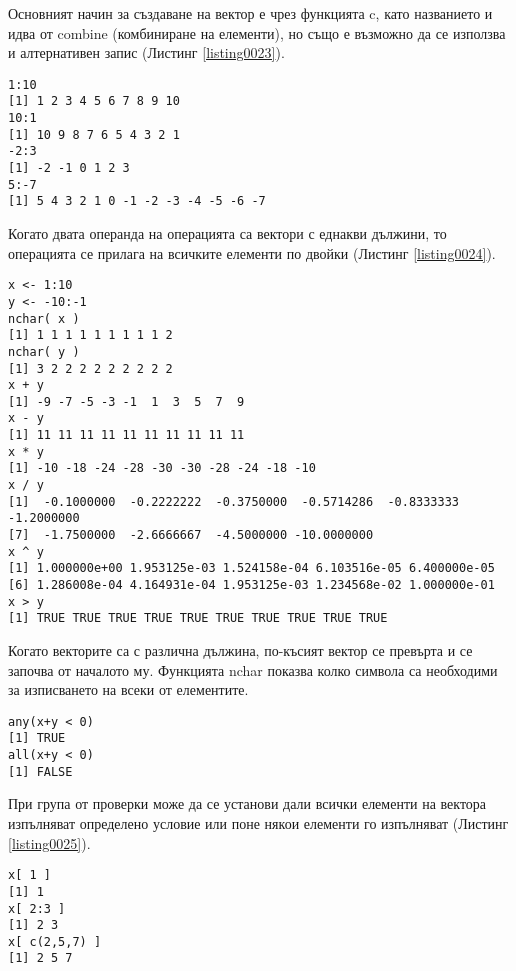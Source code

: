 Основният начин за създаване на вектор е чрез функцията c, като названието и идва от combine (комбиниране на елементи), но също е възможно да се използва и алтернативен запис (Листинг \ref{listing0023}). 

\begin{lstlisting}[caption=Алтернативен синтаксис за създаване на вектори, label=listing0023]
1:10
[1] 1 2 3 4 5 6 7 8 9 10
10:1
[1] 10 9 8 7 6 5 4 3 2 1
-2:3
[1] -2 -1 0 1 2 3
5:-7
[1] 5 4 3 2 1 0 -1 -2 -3 -4 -5 -6 -7
\end{lstlisting}

Когато двата операнда на операцията са вектори с еднакви дължини, то операцията се прилага на всичките елементи по двойки (Листинг \ref{listing0024}).

\begin{lstlisting}[caption=Операции между вектори с еднаква дължина, label=listing0024]
x <- 1:10
y <- -10:-1
nchar( x )
[1] 1 1 1 1 1 1 1 1 1 2
nchar( y )
[1] 3 2 2 2 2 2 2 2 2 2
x + y
[1] -9 -7 -5 -3 -1  1  3  5  7  9
x - y
[1] 11 11 11 11 11 11 11 11 11 11
x * y
[1] -10 -18 -24 -28 -30 -30 -28 -24 -18 -10
x / y
[1]  -0.1000000  -0.2222222  -0.3750000  -0.5714286  -0.8333333  -1.2000000
[7]  -1.7500000  -2.6666667  -4.5000000 -10.0000000
x ^ y
[1] 1.000000e+00 1.953125e-03 1.524158e-04 6.103516e-05 6.400000e-05
[6] 1.286008e-04 4.164931e-04 1.953125e-03 1.234568e-02 1.000000e-01
x > y
[1] TRUE TRUE TRUE TRUE TRUE TRUE TRUE TRUE TRUE TRUE
\end{lstlisting}

Когато векторите са с различна дължина, по-късият вектор се превърта и се започва от началото му. Функцията nchar показва колко символа са необходими за изписването на всеки от елементите. 

\begin{lstlisting}[caption=Проверка дали някоя или всички стойности от вектора отговарят на определено условие, label=listing0025]
any(x+y < 0)
[1] TRUE
all(x+y < 0)
[1] FALSE
\end{lstlisting}

При група от проверки може да се установи дали всички елементи на вектора изпълняват определено условие или поне някои елементи го изпълняват (Листинг \ref{listing0025}).

\begin{lstlisting}[caption=Достъп до отделни елементи във вектор, label=listing0026]
x[ 1 ]
[1] 1
x[ 2:3 ]
[1] 2 3
x[ c(2,5,7) ]
[1] 2 5 7
\end{lstlisting}

